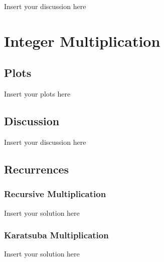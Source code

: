 \documentclass[a4paper]{article}
\begin{document}
Insert your discussion here

\section{Integer Multiplication}

\subsection{Plots}

\noindent Insert your plots here

\subsection{Discussion}

\noindent Insert your discussion here

\subsection{Recurrences}

\subsubsection{Recursive Multiplication}

\noindent Insert your solution here

\subsubsection{Karatsuba Multiplication}

\noindent Insert your solution here
\end{document}

